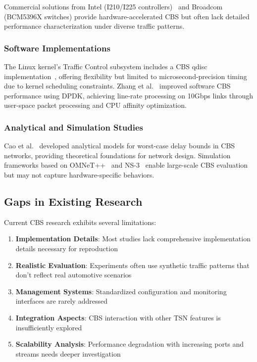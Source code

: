 \documentclass[10pt, journal, compsoc]{IEEEtran}
\begin{document}
Commercial solutions from Intel (I210/I225 controllers)~\cite{intel2021i210} and Broadcom (BCM5396X switches) provide hardware-accelerated CBS but often lack detailed performance characterization under diverse traffic patterns.

\subsubsection{Software Implementations}

The Linux kernel's Traffic Control subsystem includes a CBS qdisc implementation~\cite{linux2023cbs}, offering flexibility but limited to microsecond-precision timing due to kernel scheduling constraints. Zhang et al.~\cite{zhang2022dpdk} improved software CBS performance using DPDK, achieving line-rate processing on 10Gbps links through user-space packet processing and CPU affinity optimization.

\subsubsection{Analytical and Simulation Studies}

Cao et al.~\cite{cao2021analytical} developed analytical models for worst-case delay bounds in CBS networks, providing theoretical foundations for network design. Simulation frameworks based on OMNeT++~\cite{nafar2021omnet} and NS-3~\cite{bhattacharjee2023ns3} enable large-scale CBS evaluation but may not capture hardware-specific behaviors.

\subsection{Gaps in Existing Research}

Current CBS research exhibits several limitations:

\begin{enumerate}
    \item \textbf{Implementation Details}: Most studies lack comprehensive implementation details necessary for reproduction
    \item \textbf{Realistic Evaluation}: Experiments often use synthetic traffic patterns that don't reflect real automotive scenarios
    \item \textbf{Management Systems}: Standardized configuration and monitoring interfaces are rarely addressed
    \item \textbf{Integration Aspects}: CBS interaction with other TSN features is insufficiently explored
    \item \textbf{Scalability Analysis}: Performance degradation with increasing ports and streams needs deeper investigation
\end{enumerate}
\end{document}
